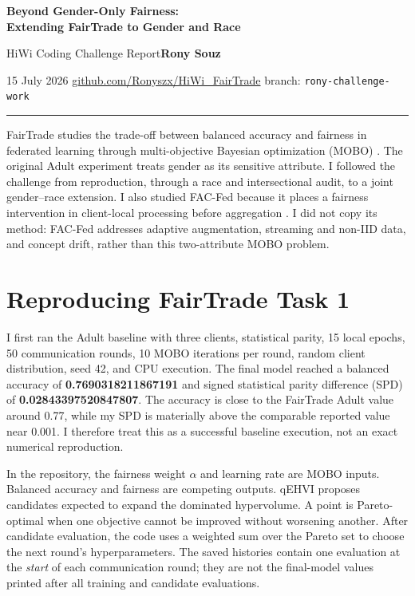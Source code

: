 \documentclass[10pt,a4paper]{article}
\newcommand{\tasktag}[1]{\textcolor{accent}{\textbf{Task #1}}}
\begin{document}
{\fontsize{18}{21}\selectfont\bfseries Beyond Gender-Only Fairness:\\[-1pt]
Extending FairTrade to Gender and Race}\par
\vspace{3pt}
{\large HiWi Coding Challenge Report}\hfill{\normalsize\textbf{Rony Souz}}\par
\vspace{2pt}
\small 15 July 2026 \quad\textbullet\quad
\href{https://github.com/Ronyszx/HiWi_FairTrade}{github.com/Ronyszx/HiWi\_FairTrade}
\quad\textbullet\quad branch: \texttt{rony-challenge-work}
\vspace{4pt}
\hrule
\vspace{4pt}

FairTrade studies the trade-off between balanced accuracy and fairness in federated learning through multi-objective Bayesian optimization (MOBO) \citep{badar2024fairtrade,badarFairTradeCode}. The original Adult experiment treats gender as its sensitive attribute. I followed the challenge from reproduction, through a race and intersectional audit, to a joint gender--race extension. I also studied FAC-Fed because it places a fairness intervention in client-local processing before aggregation \citep{badar2023facfed,badarFacFedCode}. I did not copy its method: FAC-Fed addresses adaptive augmentation, streaming and non-IID data, and concept drift, rather than this two-attribute MOBO problem.

\section*{Reproducing FairTrade \hfill \tasktag{1}}

I first ran the Adult baseline with three clients, statistical parity, 15 local epochs, 50 communication rounds, 10 MOBO iterations per round, random client distribution, seed 42, and CPU execution. The final model reached a balanced accuracy of \textbf{0.7690318211867191} and signed statistical parity difference (SPD) of \textbf{0.02843397520847807}. The accuracy is close to the FairTrade Adult value around 0.77, while my SPD is materially above the comparable reported value near 0.001. I therefore treat this as a successful baseline execution, not an exact numerical reproduction.

In the repository, the fairness weight $\alpha$ and learning rate are MOBO inputs. Balanced accuracy and fairness are competing outputs. qEHVI proposes candidates expected to expand the dominated hypervolume. A point is Pareto-optimal when one objective cannot be improved without worsening another. After candidate evaluation, the code uses a weighted sum over the Pareto set to choose the next round's hyperparameters. The saved histories contain one evaluation at the \emph{start} of each communication round; they are not the final-model values printed after all training and candidate evaluations.
\end{document}
